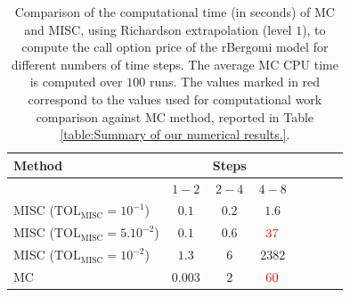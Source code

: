 \begin{table}[h!]
	\centering
	\begin{tabular}{l*{6}{c}r}
		\toprule[1.5pt]
	Method & & Steps  & &     \\
	\hline
		          & $1-2$ & $2-4$ & $4-8$   \\
		\hline
		MISC ($\text{TOL}_{\text{MISC}}=10^{-1}$)  & $0.1$ & $0.2$ & $1.6$  \\
		MISC ($\text{TOL}_{\text{MISC}}=5.10^{-2}$)  & $0.1$ & $0.6$ & ${\color{red}37}$  \\
		MISC ($\text{TOL}_{\text{MISC}}=10^{-2}$)  & $1.3$ & $6$ & $2382$  \\
		

			\hline	
		MC  &$0.003$ & $2$  & ${\color{red}60}$   \\
		
		\bottomrule[1.25pt]
		\end{tabular}
		\caption{Comparison of the computational time (in seconds) of  MC and MISC, using Richardson extrapolation (level $1$), to compute the call option price of the rBergomi model for different numbers of time steps. The average MC CPU time is computed over $100$ runs. The values marked in red correspond to the values used for computational work comparison against MC method, reported in Table \ref{table:Summary of our numerical results.}.}
		\label{Comparsion of the computational time of  MC and MISC, using Richardson extrapolation (level $1$), used to compute Call option price of rBergomi model for different number of time steps. Case set $2$ parameters,linear}
		\end{table}
		
		\FloatBarrier
		
